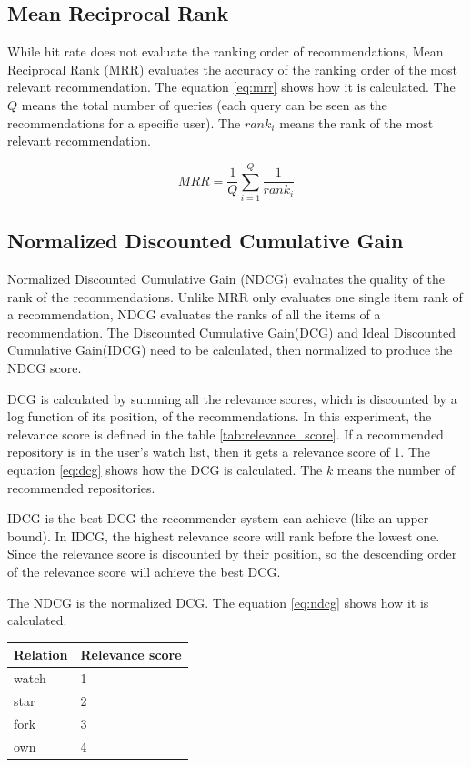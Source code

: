 \documentclass[11pt,twoside]{report}
\begin{document}
\subsection{Mean Reciprocal Rank}
While hit rate does not evaluate the ranking order of recommendations, Mean Reciprocal Rank (MRR) evaluates the accuracy of the ranking order of the most relevant recommendation. The equation \ref{eq:mrr} shows how it is calculated. The $Q$ means the total number of queries (each query can be seen as the recommendations for a specific user). The $rank_i$ means the rank of the most relevant recommendation.

\begin{equation}
    MRR=\frac{1}{Q}\sum_{i=1}^Q\frac{1}{rank_i}
    \label{eq:mrr}
\end{equation}

\subsection{Normalized Discounted Cumulative Gain}
Normalized Discounted Cumulative Gain (NDCG) evaluates the quality of the rank of the recommendations. Unlike MRR only evaluates one single item rank of a recommendation, NDCG evaluates the ranks of all the items of a recommendation. The Discounted Cumulative Gain(DCG) and Ideal Discounted Cumulative Gain(IDCG) need to be calculated, then normalized to produce the NDCG score. 

DCG is calculated by summing all the relevance scores, which is discounted by a log function of its position, of the recommendations. In this experiment, the relevance score is defined in the table \ref{tab:relevance_score}. If a recommended repository is in the user's watch list, then it gets a relevance score of 1. The equation \ref{eq:dcg} shows how the DCG is calculated. The $k$ means the number of recommended repositories.

IDCG is the best DCG the recommender system can achieve (like an upper bound). In IDCG, the highest relevance score will rank before the lowest one. Since the relevance score is discounted by their position, so the descending order of the relevance score will achieve the best DCG.

The NDCG is the normalized DCG. The equation \ref{eq:ndcg} shows how it is calculated.

\begin{center}
    \begin{tabular}{l | l}
    \hline
    Relation & Relevance score \\
    \hline
    watch & 1 \\
    star & 2 \\
    fork & 3 \\
    own & 4
    \end{tabular}
    \label{tab:relevance_score}
\end{center}
\end{document}
